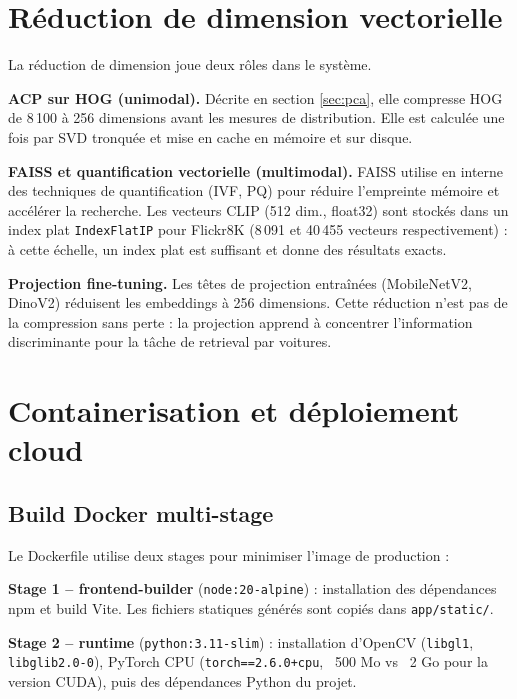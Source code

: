 \documentclass[12pt,a4paper]{report}
\begin{document}
\chapter{Réduction de dimension vectorielle}

La réduction de dimension joue deux rôles dans le système.

\textbf{ACP sur HOG (unimodal).} Décrite en section \ref{sec:pca}, elle compresse HOG de 8\,100 à 256 dimensions avant les mesures de distribution. Elle est calculée une fois par SVD tronquée et mise en cache en mémoire et sur disque.

\textbf{FAISS et quantification vectorielle (multimodal).} FAISS utilise en interne des techniques de quantification (IVF, PQ) pour réduire l'empreinte mémoire et accélérer la recherche. Les vecteurs CLIP (512 dim., float32) sont stockés dans un index plat \texttt{IndexFlatIP} pour Flickr8K (8\,091 et 40\,455 vecteurs respectivement) : à cette échelle, un index plat est suffisant et donne des résultats exacts.

\textbf{Projection fine-tuning.} Les têtes de projection entraînées (MobileNetV2, DinoV2) réduisent les embeddings à 256 dimensions. Cette réduction n'est pas de la compression sans perte : la projection apprend à concentrer l'information discriminante pour la tâche de retrieval par voitures.

\chapter{Containerisation et déploiement cloud}

\section{Build Docker multi-stage}

Le Dockerfile utilise deux stages pour minimiser l'image de production :

\textbf{Stage 1 -- frontend-builder} (\texttt{node:20-alpine}) : installation des dépendances npm et build Vite. Les fichiers statiques générés sont copiés dans \texttt{app/static/}.

\textbf{Stage 2 -- runtime} (\texttt{python:3.11-slim}) : installation d'OpenCV (\texttt{libgl1}, \texttt{libglib2.0-0}), PyTorch CPU (\texttt{torch==2.6.0+cpu}, ~500 Mo vs ~2 Go pour la version CUDA), puis des dépendances Python du projet.
\end{document}
